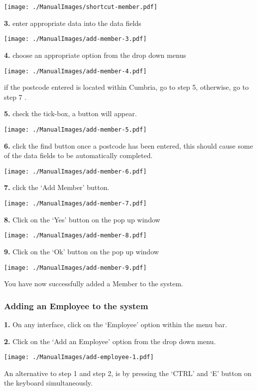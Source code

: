 \texttt{[image: ./ManualImages/shortcut-member.pdf]}

\textbf{3.} enter appropriate data into the data fields

\texttt{[image: ./ManualImages/add-member-3.pdf]}

\textbf{4.} choose an appropriate option from the drop down menus

\texttt{[image: ./ManualImages/add-member-4.pdf]}

if the postcode entered is located within Cumbria, go to step 5, otherwise, go to step 7 .

\textbf{5.} check the tick-box, a button will appear.

\texttt{[image: ./ManualImages/add-member-5.pdf]}

\textbf{6.} click the find button once a postcode has been entered, this should cause some of the data fields to be automatically completed.

\texttt{[image: ./ManualImages/add-member-6.pdf]}

\textbf{7.} click the `Add Member' button.

\texttt{[image: ./ManualImages/add-member-7.pdf]}

\textbf{8.} Click on the `Yes' button on the pop up window

\texttt{[image: ./ManualImages/add-member-8.pdf]}

\textbf{9.} Click on the `Ok' button on the pop up window

\texttt{[image: ./ManualImages/add-member-9.pdf]}

You have now successfully added a Member to the system.

\pagebreak
\subsubsection{Adding an Employee to the system}
\label{fig:Adding an Employee to the system}

\textbf{1.} On any interface, click on the `Employee' option within the menu bar.

\textbf{2.} Click on the `Add an Employee' option from the drop down menu.

\texttt{[image: ./ManualImages/add-employee-1.pdf]}

An alternative to step 1 and step 2, is by pressing the `CTRL' and `E' button on the keyboard simultaneously.

